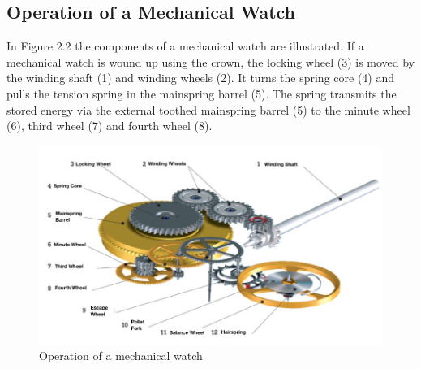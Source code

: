 \documentclass[12pt, a4paper]{report}
\begin{document}
    \subsection{Operation of a Mechanical Watch}  
    In Figure 2.2 the components of a mechanical watch are illustrated. If a mechanical watch is wound up using the crown, the locking wheel (3) is moved by the winding shaft (1) and winding wheels (2). It turns the spring core (4) and pulls the tension spring in the mainspring barrel (5). The spring transmits the stored energy via the external toothed mainspring barrel (5) to the minute wheel (6), third wheel (7) and fourth wheel (8). 
    \newline
    \noindent
    \begin{figure}[H]
    \centering
    \includegraphics[scale=0.45]{Images/Funktionsweise-Uhrwerk.jpg}
    
    \caption{Operation of a mechanical watch \cite{Uhrwerk}}
    \end{figure}
    
\end{document}
